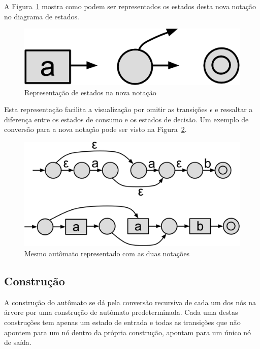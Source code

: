 \documentclass[a4paper,12pt,oneside,onecolumn]{uerj}
\begin{document}
A Figura~\ref{fig:nova_notacao} mostra como podem ser representados os estados desta nova notação no diagrama de estados.

\begin{figure}[!htbp]
  \centering
  \includegraphics[scale=0.5]{figures/nova_notacao.png}
  \caption{Representação de estados na nova notação}
  \label{fig:nova_notacao}
\end{figure}

Esta representação facilita a visualização por omitir as transições $\epsilon$ e ressaltar a diferença entre os estados de consumo e os estados de decisão. Um exemplo de conversão para a nova notação pode ser visto na Figura~\ref{fig:exemplo_nova_notacao}.

\begin{figure}[!htbp]
  \centering
  \includegraphics[scale=0.25]{figures/exemplo_nova_notacao.png}
  \caption{Mesmo autômato representado com as duas notações}
  \label{fig:exemplo_nova_notacao}
\end{figure}

\subsection{Construção}

A construção do autômato se dá pela conversão recursiva de cada um dos nós na árvore por uma construção de autômato predeterminada. Cada uma destas construções tem apenas um estado de entrada e todas as transições que não apontem para um nó dentro da própria construção, apontam para um único nó de saída.
\end{document}
